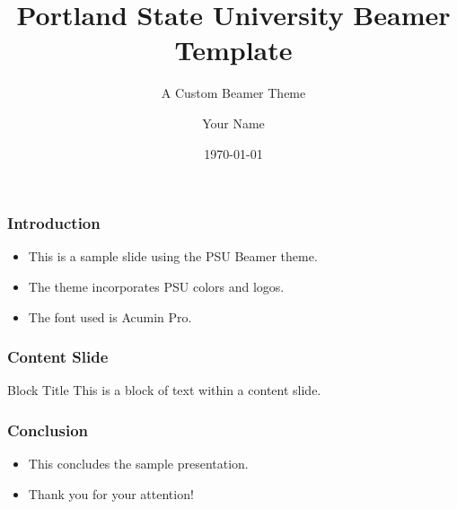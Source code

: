 \documentclass{beamer}
\title{Portland State University Beamer Template}
\subtitle{A Custom Beamer Theme}
\author{Your Name}
\institute{Portland State University}
\date{\today}
\begin{document}
\begin{frame}
    \titlepage
\end{frame}

\begin{frame}
    \frametitle{Introduction}
    \begin{itemize}
        \item This is a sample slide using the PSU Beamer theme.
        \item The theme incorporates PSU colors and logos.
        \item The font used is Acumin Pro.
    \end{itemize}
\end{frame}

\begin{frame}
    \frametitle{Content Slide}
    \begin{block}{Block Title}
        This is a block of text within a content slide.
    \end{block}
\end{frame}


\begin{frame}
    \frametitle{Conclusion}
    \begin{itemize}
        \item This concludes the sample presentation.
        \item Thank you for your attention!
    \end{itemize}
\end{frame}
\end{document}
